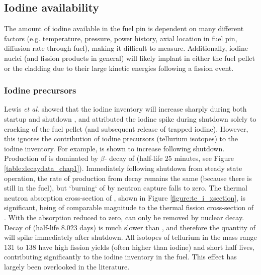 \subsection{Iodine availability}

The amount of iodine available in the fuel pin is dependent on many different factors (e.g. temperature, pressure, power history, axial location in fuel pin, diffusion rate through fuel), making it difficult to measure. Additionally, iodine nuclei (and fission products in general) will likely implant in either the fuel pellet or the cladding due to their large kinetic energies following a fission event.

\subsubsection{Iodine precursors}

Lewis \emph{et al}. showed that the iodine inventory will increase sharply during both startup and shutdown \cite{Lewis2017}, and attributed the iodine spike during shutdown solely to cracking of the fuel pellet (and subsequent release of trapped iodine). However, this ignores the contribution of iodine precursors (tellurium isotopes) to the iodine inventory. For example,  is shown to increase following shutdown. Production of  is dominated by $\beta$- decay of  (half-life 25 minutes, see Figure \ref{table:decaydata_chap1}). Immediately following shutdown from steady state operation, the rate of  production from  decay remains the same (because there is still  in the fuel), but `burning` of  by neutron capture falls to zero. The thermal neutron absorption cross-section of , shown in Figure \ref{figure:te_i_xsection}, is significant, being of comparable magnitude to the thermal fission cross-section of . With the absorption reduced to zero,  can only be removed by nuclear decay. Decay of  (half-life 8.023 days) is much slower than , and therefore the quantity of  will spike immediately after shutdown. All isotopes of tellurium in the mass range 131 to 138 have high fission yields (often higher than iodine) and short half lives, contributing significantly to the iodine inventory in the fuel. This effect has largely been overlooked in the literature.

